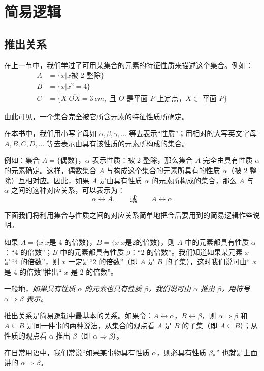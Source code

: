 \section{简易逻辑}
\subsection{推出关系}

在上一节中，我们学过了可用某集合的元素的特征性质来描述这个集合。例如：
\[\begin{split}
	A&=\{x|x\text{被 2 整除}\}\\
	B&= \{x|x^2=4\}\\
	C&=\{X|\overline{OX}=\qty{3}{cm},\; \text{且 $O$ 是平面 $P$ 上定点，$X\in$ 平面 $P$}\}
\end{split}\]

由此可见，一个集合完全被它所含元素的特征性质所确定。

在本书中，我们用小写字母如 $\alpha,\beta,\gamma,\ldots$ 等去表示“性质”；用相对的大写英文字母 $A,B,C,D,\ldots$ 等去表示由具有该性质的元素所构成的集合。

例如：集合 $A=\{\text{偶数}\}$，$\alpha$ 表示性质：被 2 整除，那么集合 $A$ 完全由具有性质 $\alpha$ 的元素确定。这样，偶数集合 $A$ 与构成这个集合的元素所具有的性质 $\alpha$（被 2 整除）互相对应。因此，如果 $A$ 是由具有性质 $\alpha$ 的元素所构成的集合，那么 $A$ 与 $\alpha$ 之间的这种对应关系，可以表示为：
\[\alpha\longleftrightarrow A,\qquad \text{或}\qquad A\longleftrightarrow \alpha\]

下面我们将利用集合与性质之间的对应关系简单地把今后要用到的简易逻辑作些说明。

如果 $A=\{x|x\text{是 4 的倍数}\}$，$B=\{x|x\text{是2的倍数}\}$，则 $A$ 中的元素都具有性质 $\alpha$：“4 的倍数”；$B$ 中的元素都具有性质 $\beta$：“2 的倍数”。我们知道如果某元素 $x$ 是“4 的倍数”，则 $x$ 一定是“2 的倍数”（即 $A$ 是 $B$ 的子集），这时我们说可由“ $x$ 是 4 的倍数”推出“ $x$ 是 2 的倍数”。

一般地，\emph{如果具有性质 $\alpha$ 的元素也具有性质 $\beta$，我们说可由 $\alpha$ 推出 $\beta$，用符号 $\alpha\Rightarrow\beta$ 表示。}

推出关系是简易逻辑中最基本的关系。如果令：$A\longleftrightarrow \alpha$，$ B\longleftrightarrow \beta$，则 $\alpha\Rightarrow\beta$ 和 $A\subseteq B$ 是同一件事的两种说法，从集合的观点看 $A$ 是 $B$ 的子集（即 $A\subseteq B$）；从性质的观点看 $\alpha$ 推出 $\beta$（即 $\alpha\Rightarrow\beta$）。

在日常用语中，我们常说“如果某事物具有性质 $\alpha$，则必具有性质 $\beta$。” 也就是上面讲的 $\alpha\Rightarrow\beta$。

